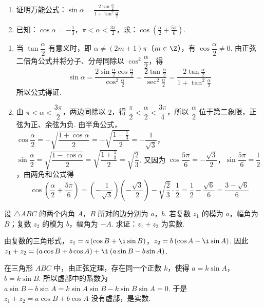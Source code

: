 \documentclass[UTF8,a4paper,oneside,11pt]{ctexbook}
\begin{document}
\begin{problem}

\begin{enumerate}
\item 证明万能公式：\(\sin\alpha=\frac{2\tan\frac{\alpha}{2}}{1+\tan^2\frac{\alpha}{2}}\).

\item 已知：\(\cos\alpha=-\frac{1}{3}\)，\(\pi<\alpha<\frac{3\pi}{2}\)，求：\(\cos\left(\frac{\alpha}{2}+\frac{5\pi}{6}\right)\).
\end{enumerate}

\begin{solution}
\begin{enumerate}
\item 当 \(\tan\dfrac{\alpha}{2}\) 有意义时，即 \(\alpha\neq(2m+1)\pi\)（\(m\in\Z\)），有 \(\cos\dfrac{\alpha}{2}\neq0\). 由正弦二倍角公式并将分子、分母同除以 \(\cos^2\dfrac{\alpha}{2}\)，得
\[
\sin\alpha=\frac{2\sin\frac{\alpha}{2}\cos\frac{\alpha}{2}}{\cos^2\frac{\alpha}{2}}=\frac{2\tan\frac{\alpha}{2}}{\sec^2\frac{\alpha}{2}}=\frac{2\tan\frac{\alpha}{2}}{1+\tan^2\frac{\alpha}{2}}
\]
所以公式得证.
\item 由 \(\pi<\alpha<\dfrac{3\pi}{2}\)，两边同除以 \(2\)，得 \(\dfrac{\pi}{2}<\dfrac{\alpha}{2}<\dfrac{3\pi}{4}\)，所以 \(\dfrac{\alpha}{2}\) 位于第二象限，正弦为正、余弦为负. 由半角公式，
\(\cos\dfrac{\alpha}{2}=-\sqrt{\dfrac{1+\cos\alpha}{2}}=-\sqrt{\dfrac{1-\frac13}{2}}=-\dfrac{1}{\sqrt3}\)，
\(\sin\dfrac{\alpha}{2}=\sqrt{\dfrac{1-\cos\alpha}{2}}=\sqrt{\dfrac{1+\frac13}{2}}=\sqrt{\dfrac23}\).
又因为 \(\cos\dfrac{5\pi}{6}=-\dfrac{\sqrt3}{2}\)，\(\sin\dfrac{5\pi}{6}=\dfrac12\)，由两角和公式得
\[
\cos\left(\frac{\alpha}{2}+\frac{5\pi}{6}\right)=\left(-\frac{1}{\sqrt3}\right)\left(-\frac{\sqrt3}{2}\right)-\sqrt{\frac23}\cdot\frac12=\frac12-\frac{\sqrt6}{6}=\frac{3-\sqrt6}{6}
\]
\end{enumerate}
\end{solution}
\end{problem}

\begin{problem}

设 \(\triangle ABC\) 的两个内角 \(A\)，\(B\) 所对的边分别为 \(a\)，\(b\). 若复数 \(z_1\) 的模为 \(a\)，幅角为 \(B\)；复数 \(z_2\) 的模为 \(b\)，幅角为 \(-A\). 求证：\(z_1+z_2\) 为实数.

\begin{solution}
由复数的三角形式，\(z_1=a\left(\cos B+\i\sin B\right)\)，\(z_2=b\left(\cos A-\i\sin A\right)\). 因此 \(z_1+z_2=\left(a\cos B+b\cos A\right)+\i\left(a\sin B-b\sin A\right)\).

在三角形 \(ABC\) 中，由正弦定理，存在同一个正数 \(k\)，使得 \(a=k\sin A\)，\(b=k\sin B\). 所以虚部中的系数为 \(a\sin B-b\sin A=k\sin A\sin B-k\sin B\sin A=0\). 于是 \(z_1+z_2=a\cos B+b\cos A\) 没有虚部，是实数.
\end{solution}
\end{problem}
\end{document}
